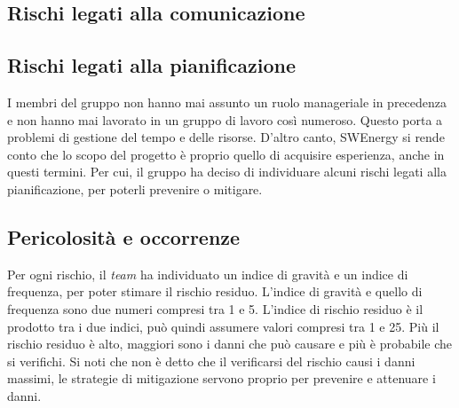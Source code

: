 \subsection{Rischi legati alla comunicazione}






\subsection{Rischi legati alla pianificazione}
I membri del gruppo non hanno mai assunto un ruolo manageriale in
precedenza e non hanno mai lavorato in un gruppo di lavoro così
numeroso. Questo porta a problemi di gestione del tempo e delle
risorse. D'altro canto, SWEnergy si rende conto che lo scopo del
progetto è proprio quello di acquisire esperienza, anche in questi
termini. Per cui, il gruppo ha deciso di individuare alcuni
rischi legati alla pianificazione, per poterli prevenire o mitigare.







\subsection{Pericolosità e occorrenze}

Per ogni rischio, il \textit{team} ha individuato un indice di gravità e un
indice di frequenza, per poter stimare il rischio residuo. L'indice di
gravità e quello di frequenza sono due numeri compresi tra 1 e 5. L'indice di
rischio residuo è il prodotto tra i due indici, può quindi assumere valori
compresi tra 1 e 25. Più il rischio residuo è alto, maggiori sono i danni che
può causare e più è probabile che si verifichi. Si noti che non è detto che il
verificarsi del rischio causi i danni massimi, le strategie di
mitigazione servono proprio per prevenire e attenuare i danni.


